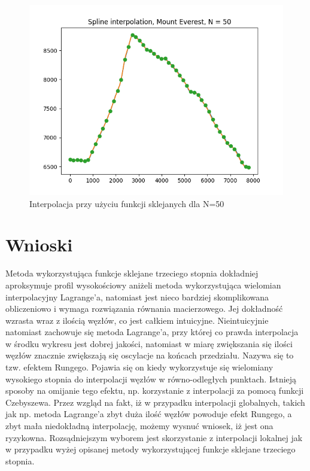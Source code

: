 \documentclass{article}
\begin{document}
\begin{itemize}
\begin{figure}[!htb]
      \includegraphics[width=\linewidth]{Mount_Everest_splines_N_50.png}
      \caption{Interpolacja przy użyciu funkcji sklejanych dla N=50}
    \endminipage\hfill
    \end{figure}
    
\end{itemize}

\section{Wnioski}
Metoda wykorzystująca funkcje sklejane trzeciego stopnia dokładniej aproksymuje profil wysokościowy aniżeli metoda wykorzystująca wielomian interpolacyjny Lagrange'a, natomiast jest nieco bardziej skomplikowana obliczeniowo i wymaga rozwiązania równania macierzowego. Jej dokładność wzrasta wraz z ilością węzłów, co jest całkiem intuicyjne. Nieintuicyjnie natomiast zachowuje się metoda Lagrange'a, przy której co prawda interpolacja w środku wykresu jest dobrej jakości, natomiast w miarę zwiększania się ilości węzłów znacznie zwiększają się oscylacje na końcach przedziału. Nazywa się to tzw. efektem Rungego. Pojawia się on kiedy wykorzystuje się wielomiany wysokiego stopnia do interpolacji węzłów w równo-odległych punktach. Istnieją sposoby na omijanie tego efektu, np. korzystanie z interpolacji za pomocą funkcji Czebyszewa. Przez wzgląd na fakt, iż w przypadku interpolacji globalnych, takich jak np. metoda Lagrange'a zbyt duża ilość węzłów powoduje efekt Rungego, a zbyt mała niedokładną interpolację, możemy wysnuć wniosek, iż jest ona ryzykowna. Rozsądniejszym wyborem jest skorzystanie z interpolacji lokalnej jak w przypadku wyżej opisanej metody wykorzystującej funkcje sklejane trzeciego stopnia.
\end{document}
